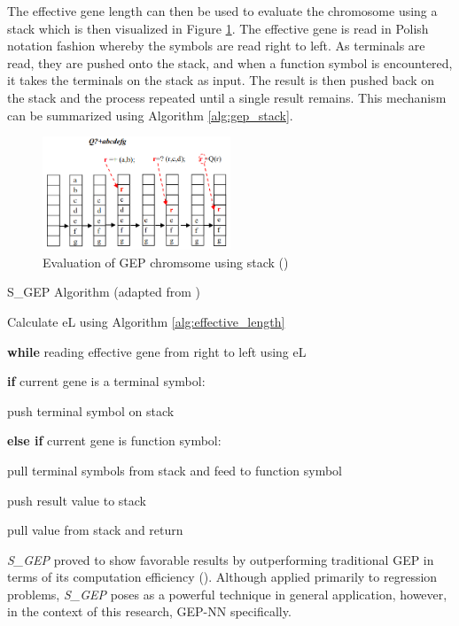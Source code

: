 \noindent The effective gene length can then be used to evaluate the chromosome using a stack which is then visualized in Figure \ref{fig:gep_stack}. The effective gene is read in Polish notation fashion whereby the symbols are read right to left. As terminals are read, they are pushed onto the stack, and when a function symbol is encountered, it takes the terminals on the stack as input. The result is then pushed back on the stack and the process repeated until a single result remains. This mechanism can be summarized using Algorithm \ref{alg:gep_stack}.

\begin{figure}[H] %
    \centering %
    \includegraphics[width=0.5\textwidth]{Figures/chapter_gep/gep_stack.png} %
    \caption{Evaluation of GEP chromsome using stack (\cite{peng2014improved})}
    \label{fig:gep_stack} %
\end{figure}

\begin{algorithm}
	\caption{S\_GEP Algorithm (adapted from \cite{peng2014improved})}\label{alg:gep_stack}
	\begin{algorithmic}[1]
	\item Calculate eL using Algorithm \ref{alg:effective_length}
	\item \textbf{while} reading effective gene from right to left using eL
	\item \quad \textbf{if} current gene is a terminal symbol:
	\item \quad \quad push terminal symbol on stack
	\item \quad \textbf{else if} current gene is function symbol:
	\item \quad \quad pull terminal symbols from stack and feed to function symbol
	\item \quad \quad push result value to stack
	\item pull value from stack and return
\end{algorithmic}
\end{algorithm}

\noindent \textit{S\_GEP} proved to show favorable results by outperforming traditional GEP in terms of its computation efficiency (\cite{peng2014improved}). Although applied primarily to regression problems, \textit{S\_GEP} poses as a powerful technique in general application, however, in the context of this research, GEP-NN specifically.